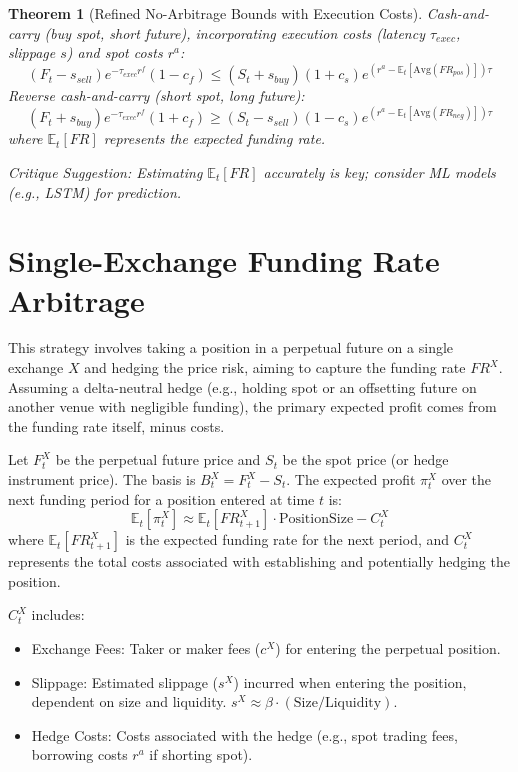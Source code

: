 \documentclass{article}
\newtheorem{theorem}{Theorem}
\begin{document}
\begin{theorem}[Refined No-Arbitrage Bounds with Execution Costs]
Cash-and-carry (buy spot, short future), incorporating execution costs (latency $\tau_{exec}$, slippage $s$) and spot costs $r^a$:
\begin{equation}
    (F_t - s_{sell}) e^{-\tau_{exec} r^f} (1-c_f) \le (S_t + s_{buy}) (1+c_s) e^{(r^a - \mathbb{E}_t[\text{Avg}(FR_{pos})])\tau}
\end{equation}
Reverse cash-and-carry (short spot, long future):
\begin{equation}
    (F_t + s_{buy}) e^{-\tau_{exec} r^f} (1+c_f) \ge (S_t - s_{sell}) (1-c_s) e^{(r^a - \mathbb{E}_t[\text{Avg}(FR_{neg})])\tau}
\end{equation}
where $\mathbb{E}_t[FR]$ represents the expected funding rate.

\textit{Critique Suggestion:} Estimating $\mathbb{E}_t[FR]$ accurately is key; consider ML models (e.g., LSTM) for prediction.
\end{theorem}

\section{Single-Exchange Funding Rate Arbitrage}

This strategy involves taking a position in a perpetual future on a single exchange $X$ and hedging the price risk, aiming to capture the funding rate $FR^X$. Assuming a delta-neutral hedge (e.g., holding spot or an offsetting future on another venue with negligible funding), the primary expected profit comes from the funding rate itself, minus costs.

Let $F^X_t$ be the perpetual future price and $S_t$ be the spot price (or hedge instrument price). The basis is $B^X_t = F^X_t - S_t$.
The expected profit $\pi^X_t$ over the next funding period for a position entered at time $t$ is:
\begin{equation} \label{eq:profit_single_strat}
    \mathbb{E}_t[\pi^X_t] \approx \mathbb{E}_t[FR^X_{t+1}] \cdot \text{PositionSize} - C^X_t
\end{equation}
where $\mathbb{E}_t[FR^X_{t+1}]$ is the expected funding rate for the next period, and $C^X_t$ represents the total costs associated with establishing and potentially hedging the position.

$C^X_t$ includes:
\begin{itemize}
    \item Exchange Fees: Taker or maker fees ($c^X$) for entering the perpetual position.
    \item Slippage: Estimated slippage ($s^X$) incurred when entering the position, dependent on size and liquidity. $s^X \approx \beta \cdot (\text{Size} / \text{Liquidity})$.
    \item Hedge Costs: Costs associated with the hedge (e.g., spot trading fees, borrowing costs $r^a$ if shorting spot).
\end{itemize}
\end{document}
